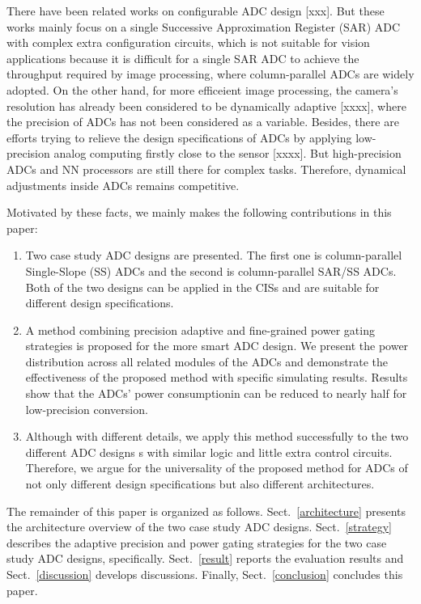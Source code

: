 \documentclass[conference]{IEEEtran}
\begin{document}
There have been related works on configurable ADC design [xxx]. But these works mainly focus on a single Successive Approximation Register (SAR) ADC with complex extra configuration circuits,
which is not suitable for vision applications because it is difficult for a single SAR ADC to achieve the throughput required by image processing, where column-parallel ADCs are widely adopted.
On the other hand, for more efficeient image processing, the camera’s resolution has already been considered to be dynamically adaptive [xxxx], where the precision of ADCs has not been 
considered as a variable. Besides, there are efforts trying to relieve the design specifications of ADCs by applying low-precision analog computing firstly close to the sensor [xxxx]. 
But high-precision ADCs and NN processors are still there for complex tasks. Therefore, dynamical adjustments inside ADCs remains competitive.

Motivated by these facts, we mainly makes the following contributions in this paper:
\begin{enumerate}[\IEEEsetlabelwidth{3)}]
	\item Two case study ADC designs are presented. The first one is column-parallel Single-Slope (SS) ADCs and the second is column-parallel SAR/SS ADCs.
	Both of the two designs can be applied in the CISs and are suitable for different design specifications.
	\item A method combining precision adaptive and fine-grained power gating strategies is proposed for the more smart ADC design.
	We present the power distribution across all related modules of the ADCs and demonstrate the effectiveness of the proposed method with specific simulating results.
	Results show that the ADCs' power consumptionin can be reduced to nearly half for low-precision conversion.  
	\item Although with different details, we apply this method successfully to the two different ADC designs s with similar logic and little extra control circuits. 
	Therefore, we argue for the universality of the proposed method for ADCs of not only different design specifications but also different architectures.
\end{enumerate} 

The remainder of this paper is organized as follows. 
Sect.~\ref{architecture} presents the architecture overview of the two case study ADC designs. 
Sect.~\ref{strategy} describes the adaptive precision and power gating strategies for the two case study ADC designs, specifically. 
Sect.~\ref{result} reports the evaluation results and Sect.~\ref{discussion} develops discussions. 
Finally, Sect.~\ref{conclusion} concludes this paper.
\end{document}
